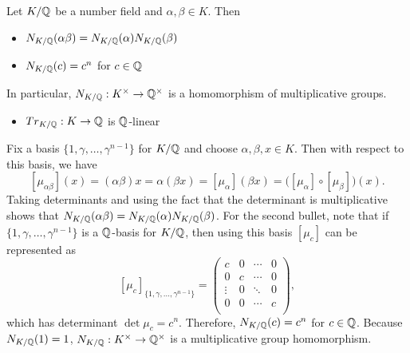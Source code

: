 \begin{prop} 
Let $K/\mathbb{Q}$ be a number field and $\alpha, \beta \in K$. Then 
	\begin{itemize}
	\item $N_{K/\mathbb{Q}}(\alpha\beta)=N_{K/\mathbb{Q}}(\alpha) N_{K/\mathbb{Q}}(\beta)$
	\item $N_{K/\mathbb{Q}}(c)=c^n$ for $c \in \mathbb{Q}$
	\end{itemize}
In particular, $N_{K/\mathbb{Q}}: K^\times \to \mathbb{Q}^\times$ is a homomorphism of multiplicative groups.
	\begin{itemize}
	\item $Tr_{K/\mathbb{Q}}: K \to \mathbb{Q}$ is $\mathbb{Q}$-linear
	\end{itemize}
\end{prop}

\pf Fix a basis $\{1, \gamma, \ldots, \gamma^{n-1} \}$ for $K/\mathbb{Q}$ and choose $\alpha, \beta, x \in K$. Then with respect to this basis, we have
	\[
	[\mu_{\alpha\beta}](x)= (\alpha\beta) x= \alpha (\beta x)= [\mu_\alpha](\beta x)= \big( [\mu_\alpha] \circ [\mu_\beta] \big)(x).
	\] 
Taking determinants and using the fact that the determinant is multiplicative shows that $N_{K/\mathbb{Q}}(\alpha\beta)=N_{K/\mathbb{Q}}(\alpha) N_{K/\mathbb{Q}}(\beta)$. For the second bullet, note that if $\{1, \gamma, \ldots, \gamma^{n-1} \}$ is a $\mathbb{Q}$-basis for $K/\mathbb{Q}$, then using this basis $[\mu_c]$ can be represented as 
	\[
	[\mu_c]_{\{1, \gamma, \ldots, \gamma^{n-1} \}}=
	\begin{pmatrix}
	c & 0 & \cdots & 0 \\
	0 & c & \cdots & 0 \\
	\vdots & 0 & \ddots & 0 \\
	0 & 0 & \cdots & c \\
	\end{pmatrix},
	\]
which has determinant $\det \mu_c= c^n$. Therefore, $N_{K/\mathbb{Q}}(c)=c^n$ for $c \in \mathbb{Q}$. Because $N_{K/\mathbb{Q}}(1)= 1$, $N_{K/\mathbb{Q}}: K^\times \to \mathbb{Q}^\times$ is a multiplicative group homomorphism. 

